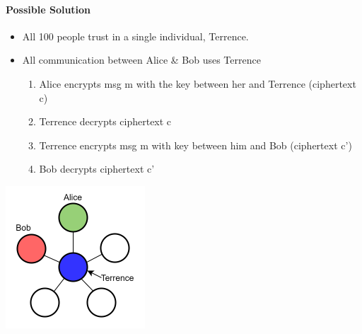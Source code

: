 \paragraph{Possible Solution}
\begin{minipage}{0.8\linewidth}
  \begin{itemize}
    \item All 100 people trust in a single individual, Terrence.
    \item All communication between Alice \& Bob uses Terrence
          \begin{enumerate}
            \item Alice encrypts msg m with the key between her and Terrence (ciphertext c)
            \item Terrence decrypts ciphertext c
            \item Terrence encrypts msg m with key between him and Bob (ciphertext c')
            \item Bob decrypts ciphertext c'
          \end{enumerate}
  \end{itemize}
\end{minipage}
\begin{minipage}{0.2\linewidth}
  \includegraphics[width=\linewidth]{images/EmbeddedSecurity/AliceBob.png}
\end{minipage}
